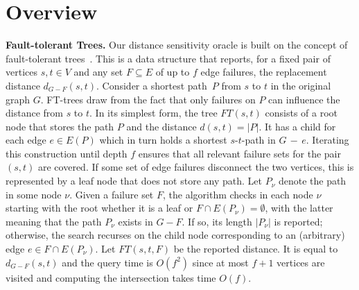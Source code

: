 \documentclass{article}\usepackage[a4paper,margin=20mm]{geometry}
\newcommand*{\length}[1]{|#1|}
\begin{document}
\section{Overview}
\label{sec:overview}

\textbf{Fault-tolerant Trees.}
Our distance sensitivity oracle is built on the concept of fault-tolerant trees~\cite{ChCoFiKa17}.
This is a data structure that reports,
for a fixed pair of vertices $s,t \in V$ and any set $F \subseteq E$ of up to $f$ edge failures,
the replacement distance $d_{G-F}(s,t)$.
Consider a shortest path~$P$ from $s$ to $t$ in the original graph $G$.
FT-trees draw from the fact that only failures on $P$ can influence the distance from $s$ to $t$.
In its simplest form, the tree $FT(s,t)$ consists of a root node that stores the path $P$
and the distance $d(s,t) = |P|$.
It has a child for each edge $e \in E(P)$ which in turn holds a shortest $s$-$t$-path in $G\,{-}\,e$.
Iterating this construction until depth $f$ ensures 
that all relevant failure sets for the pair $(s,t)$ are covered.
If some set of edge failures disconnect the two vertices,
this is represented by a leaf node that does not store any path.
Let $P_\nu$ denote the path in some node $\nu$.
Given a failure set $F$, the algorithm checks in each node $\nu$ starting with the root 
whether it is a leaf or $F \cap E(P_\nu) = \emptyset$,
with the latter meaning that the path $P_\nu$ exists in $G-F$.
If so, its length $\length{P_\nu}$ is reported;
otherwise, the search recurses on the child node corresponding to 
an (arbitrary) edge $e \in F \cap E(P_\nu)$.
Let $FT(s,t,F)$ be the reported distance.
It is equal to $d_{G-F}(s,t)$ and the query time is $O(f^2)$ since at most $f{+}1$ vertices are visited and
computing the intersection takes time $O(f)$.
\end{document}

